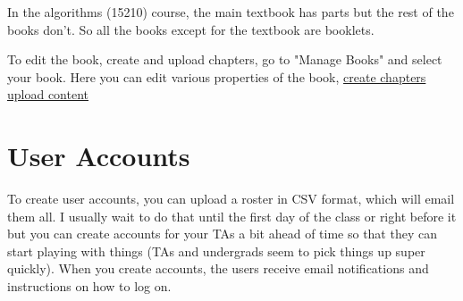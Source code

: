 \begin{example}
In the algorithms (15210) course, the main textbook has parts but
the rest of the books don't.  So all the books except for the textbook are booklets.
\end{example}


\begin{gram}
To edit the book, create and upload chapters, go to "Manage Books" and select your book.  Here you can edit various properties of the book, 
%
\href{guide:chapter::create}{create chapters}
%
\href{guide:chapter::upload}{upload content}
\end{gram}


\section{User Accounts} 

\begin{gram}[Creation]
To create user accounts, you can upload a roster in CSV format, which will email them all.  
%
I usually wait to do that until the first day of the class or right before it but you can create accounts for your TAs a bit ahead of time so that they can start playing with things (TAs and undergrads seem to pick things up super quickly).  When you create accounts, the users receive email notifications and instructions on how to log on.
\end{gram}

